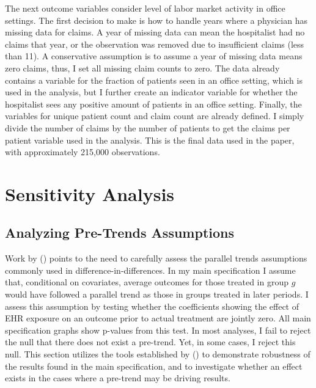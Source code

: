 \documentclass[12pt]{article}
\begin{document}
The next outcome variables consider level of labor market activity in office settings. The first decision to make is how to handle years where a physician has missing data for claims. A year of missing data can mean the hospitalist had no claims that year, or the observation was removed due to insufficient claims (less than 11). A conservative assumption is to assume a year of missing data means zero claims, thus, I set all missing claim counts to zero. The data already contains a variable for the fraction of patients seen in an office setting, which is used in the analysis, but I further create an indicator variable for whether the hospitalist sees any positive amount of patients in an office setting. Finally, the variables for unique patient count and claim count are already defined. I simply divide the number of claims by the number of patients to get the claims per patient variable used in the analysis. This is the final data used in the paper, with approximately 215,000 observations. 



\section{Sensitivity Analysis}

\subsection{Analyzing Pre-Trends Assumptions}\label{sec:pretrends}

Work by \citeauthor{rambachan2019honest} (\citeyear{rambachan2019honest}) points to the need to carefully assess the parallel trends assumptions commonly used in difference-in-differences. In my main specification I assume that, conditional on covariates, average outcomes for those treated in group $g$ would have followed a parallel trend as those in groups treated in later periods. I assess this assumption by testing whether the coefficients showing the effect of EHR exposure on an outcome prior to actual treatment are jointly zero. All main specification graphs show p-values from this test. In most analyses, I fail to reject the null that there does not exist a pre-trend. Yet, in some cases, I reject this null. This section utilizes the tools established by \citeauthor{rambachan2019honest} (\citeyear{rambachan2019honest}) to demonstrate robustness of the results found in the main specification, and to investigate whether an effect exists in the cases where a pre-trend may be driving results. 
\end{document}
